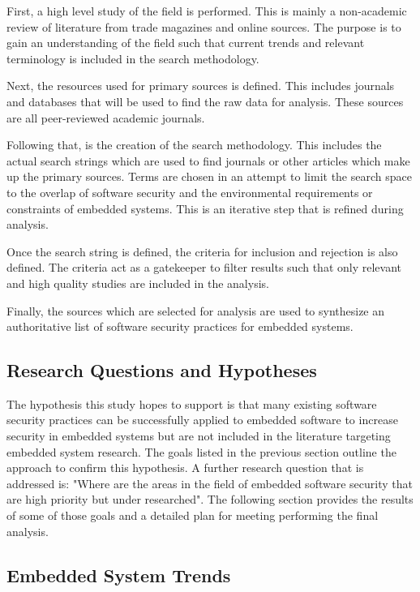 \documentclass[draftcls,onecolumn,conference,12pt]{IEEEtran}
\begin{document}
First, a high level study of the field is performed.  This is mainly a non-academic review of literature from trade magazines and online sources. The purpose is to gain an understanding of the field such that current trends and relevant terminology is included in the search methodology.

Next, the resources used for primary sources is defined.  This includes journals and databases that will be used to find the raw data for analysis.  These sources are all peer-reviewed academic journals.

Following that, is the creation of the search methodology.  This includes the actual search strings which are used to find journals or other articles which make up the primary sources.  Terms are chosen in an attempt to limit the search space to the overlap of software security and the environmental requirements or constraints of embedded systems.  This is an iterative step that is refined during analysis.

Once the search string is defined, the criteria for inclusion and rejection is also defined.  The criteria act as a gatekeeper to filter results such that only relevant and high quality studies are included in the analysis.

Finally, the sources which are selected for analysis are used to synthesize an authoritative list of software security practices for embedded systems.  

\subsection{Research Questions and Hypotheses}

The hypothesis this study hopes to support is that many existing software security practices can be successfully applied to embedded software to increase security in embedded systems but are not included in the literature targeting embedded system research.  The goals listed in the previous section outline the approach to confirm this hypothesis.  A further research question that is addressed is: "Where are the areas in the field of embedded software security that are high priority but under researched". The following section provides the results of some of those goals and a detailed plan for meeting performing the final analysis.

\subsection{Embedded System Trends}
\end{document}
